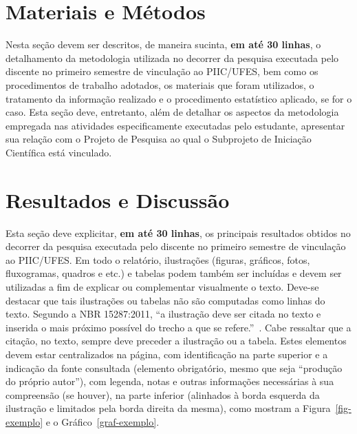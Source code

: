 \documentclass[10pt, a4paper]{article}
\begin{document}
\section{Materiais e Métodos}
\label{sec-metodo}

Nesta seção devem ser descritos, de maneira sucinta, \textbf{em até 30 linhas}, o detalhamento da metodologia utilizada no decorrer da pesquisa executada pelo discente no primeiro semestre de vinculação ao PIIC/UFES, bem como os procedimentos de trabalho adotados, os materiais que foram utilizados, o tratamento da informação realizado e o procedimento estatístico aplicado, se for o caso. Esta seção deve, entretanto, além de detalhar os aspectos da metodologia empregada nas atividades especificamente executadas pelo estudante, apresentar sua relação com o Projeto de Pesquisa ao qual o Subprojeto de Iniciação Científica está vinculado.



\section{Resultados e Discussão}
\label{sec-resultados}

Esta seção deve explicitar, \textbf{em até 30 linhas}, os principais resultados obtidos no decorrer da pesquisa executada pelo discente no primeiro semestre de vinculação ao PIIC/UFES. Em todo o relatório, ilustrações (figuras, gráficos, fotos, fluxogramas, quadros e etc.) e tabelas podem também ser incluídas e devem ser utilizadas a fim de explicar ou complementar visualmente o texto. Deve-se destacar que tais ilustrações ou tabelas não são computadas como linhas do texto. Segundo a NBR 15287:2011, ``a ilustração deve ser citada no texto e inserida o mais próximo possível do trecho a que se refere.''~\citep[p. 8]{abnt:nbr15287}. Cabe ressaltar que a citação, no texto, sempre deve preceder a ilustração ou a tabela. Estes elementos devem estar centralizados na página, com identificação na parte superior e a indicação da fonte consultada (elemento obrigatório, mesmo que seja “produção do próprio autor”), com legenda, notas e outras informações necessárias à sua compreensão (se houver), na parte inferior (alinhados à borda esquerda da ilustração e limitados pela borda direita da mesma), como mostram a Figura~\ref{fig-exemplo} e o Gráfico~\ref{graf-exemplo}.
\end{document}
